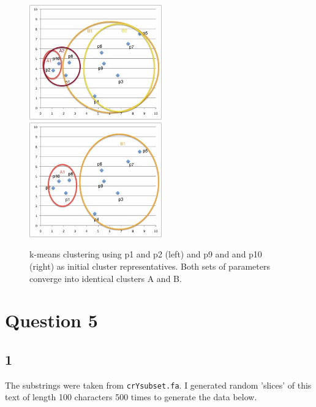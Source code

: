 \documentclass[12pt]{article}
\begin{document}
\begin{figure}[h]
\centering
\includegraphics[width=2.25in]{chart12.jpg}
\hspace{1cm}
\includegraphics[width=2.25in]{chart910.jpg}
\caption{k-means clustering using p1 and p2 (left) and p9 and and p10 (right) as initial cluster representatives.  Both sets of parameters converge into identical clusters A and B.}
\label{kcharts}
\end{figure}
\clearpage
\section*{Question 5}
\subsection*{1} The substrings were taken from \lstinline{crYsubset.fa}.  I generated random 'slices' of this text of length 100 characters 500 times to generate the data below.
\end{document}
